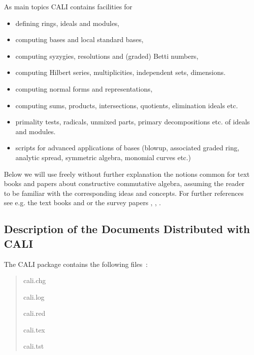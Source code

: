 As main topics CALI contains facilities for
\begin{itemize}
\item defining rings, ideals and modules,

\item computing \gr bases and local standard bases,

\item computing syzygies, resolutions and (graded) Betti numbers,

\item computing Hilbert series, multiplicities, independent sets,
dimensions.

\item computing normal forms and representations,

\item computing sums, products, intersections, quotients, elimination
ideals etc.

\item primality tests, radicals, unmixed parts, primary decompositions 
etc. of ideals and modules. 

\item scripts for advanced applications of \gr bases (blowup,
associated graded ring, analytic spread, symmetric algebra, 
monomial curves etc.)
\end{itemize}

Below we will use freely without further explanation the notions
common for text books and papers about constructive commutative
algebra, assuming the reader to be familiar with the corresponding
ideas and concepts. For further references see e.g. the text books
\cite{BKW} and \cite{CLO} or the survey papers \cite{B1}, \cite{B2},
\cite{Ro}. 

\subsection{Description of the Documents Distributed with CALI}

The CALI package contains the following files~:
\begin{quote}
cali.chg


cali.log


cali.red


cali.tex


cali.tst


\end{quote}


